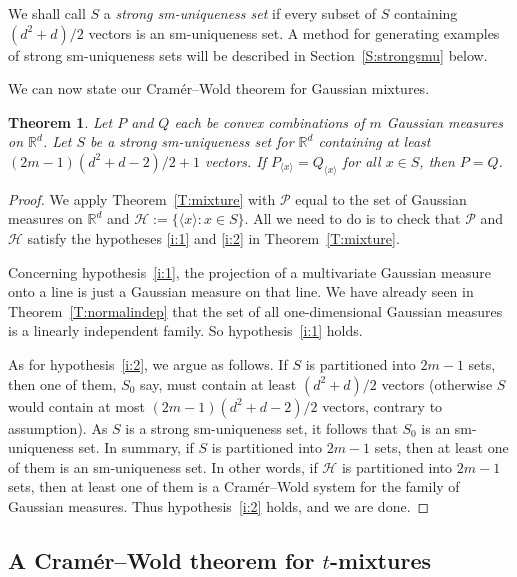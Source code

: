 \documentclass[11pt]{amsart}
\theoremstyle{plain}
\newtheorem{theorem}{Theorem}[section]
\theoremstyle{remark}
\newcommand{\RR}{\mathbb{R}}
\newcommand{\cH}{\mathcal{H}}
\newcommand{\cP}{\mathcal{P}}
\begin{document}
We shall call $S$ a \emph{strong sm-uniqueness set} if every subset of $S$ containing $(d^2+d)/2$ vectors
is an sm-uniqueness set.  A method for generating examples of strong sm-uniqueness sets
will be described in Section~\ref{S:strongsmu} below.




We can now state our Cram\'er--Wold theorem for Gaussian mixtures.
	
\begin{theorem}\label{T:gaussmixture}
Let $P$ and $Q$ each be convex combinations of $m$ Gaussian measures on $\RR^d$. 
Let $S$ be a strong sm-uniqueness set for $\RR^d$ containing at least $(2m-1)(d^2+d-2)/2+1$ vectors.
If $P_{\langle x\rangle}=Q_{\langle x\rangle}$ for all $x\in S$, then $P=Q$.
\end{theorem}
	
\begin{proof}
We apply Theorem~\ref{T:mixture} with $\cP$ equal to the set of Gaussian measures on $\RR^d$
and $\cH:=\{\langle x\rangle: x\in S\}$. All we need to do is to check that $\cP$ and $\cH$ satisfy the
hypotheses \eqref{i:1} and \eqref{i:2} in Theorem~\ref{T:mixture}.
		
Concerning hypothesis~\eqref{i:1}, 
the projection of a multivariate Gaussian measure onto a line
is just a Gaussian measure on that line.
We have already seen in Theorem~\ref{T:normalindep}
that the set of all one-dimensional Gaussian measures is a
linearly independent family. So hypothesis~\eqref{i:1} holds.
		
As for hypothesis~\eqref{i:2}, we argue as follows.
If $S$ is partitioned into $2m-1$ sets, then one of them, $S_0$ say, 
must contain at least $(d^2+d)/2$ vectors
(otherwise $S$ would contain at most $(2m-1)(d^2+d-2)/2$ vectors, contrary to assumption).
As $S$ is a strong sm-uniqueness set, it follows that $S_0$ is an sm-uniqueness set.
In summary, if $S$ is partitioned into $2m-1$ sets, then at least one of them is an sm-uniqueness set.
In other words, if $\cH$ is partitioned into $2m-1$ sets,
then at least one of them is a Cram\'er--Wold system for the family of Gaussian measures. 
Thus hypothesis~\eqref{i:2} holds, and we are done.
\end{proof}
	
	
\subsection{A Cram\'er--Wold theorem for $t$-mixtures}
	
\end{document}
